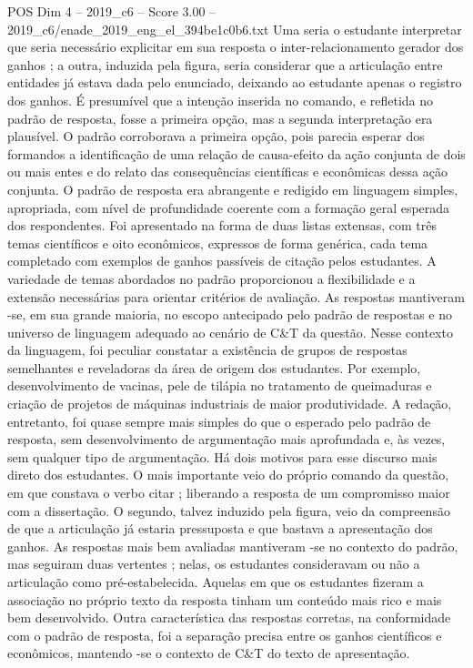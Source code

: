 \begin{textsample}{POS Dim 4 – 2019\_c6 – Score 3.00 – 2019\_c6/enade\_2019\_eng\_el\_394be1c0b6.txt}
Uma seria o estudante interpretar que seria necessário explicitar em sua resposta o inter-relacionamento gerador dos ganhos ; a outra, induzida pela figura, seria considerar que a articulação entre entidades já estava dada pelo enunciado, deixando ao estudante apenas o registro dos ganhos.
É presumível que a intenção inserida no comando, e refletida no padrão de resposta, fosse a primeira opção, mas a segunda interpretação era plausível.
O padrão corroborava a primeira opção, pois parecia esperar dos formandos a identificação de uma relação de causa-efeito da ação conjunta de dois ou mais entes e do relato das consequências científicas e econômicas dessa ação conjunta.
O padrão de resposta era abrangente e redigido em linguagem simples, apropriada, com nível de profundidade coerente com a formação geral esperada dos respondentes.
Foi apresentado na forma de duas listas extensas, com três temas científicos e oito econômicos, expressos de forma genérica, cada tema completado com exemplos de ganhos passíveis de citação pelos estudantes.
A variedade de temas abordados no padrão proporcionou a flexibilidade e a extensão necessárias para orientar critérios de avaliação.
As respostas mantiveram -se, em sua grande maioria, no escopo antecipado pelo padrão de respostas e no universo de linguagem adequado ao cenário de C\&T da questão.
Nesse contexto da linguagem, foi peculiar constatar a existência de grupos de respostas semelhantes e reveladoras da área de origem dos estudantes.
Por exemplo, desenvolvimento de vacinas, pele de tilápia no tratamento de queimaduras e criação de projetos de máquinas industriais de maior produtividade.
A redação, entretanto, foi quase sempre mais simples do que o esperado pelo padrão de resposta, sem desenvolvimento de argumentação mais aprofundada e, às vezes, sem qualquer tipo de argumentação.
Há dois motivos para esse discurso mais direto dos estudantes.
O mais importante veio do próprio comando da questão, em que constava o verbo citar ; liberando a resposta de um compromisso maior com a dissertação.
O segundo, talvez induzido pela figura, veio da compreensão de que a articulação já estaria pressuposta e que bastava a apresentação dos ganhos.
As respostas mais bem avaliadas mantiveram -se no contexto do padrão, mas seguiram duas vertentes ; nelas, os estudantes consideravam ou não a articulação como pré-estabelecida.
Aquelas em que os estudantes fizeram a associação no próprio texto da resposta tinham um conteúdo mais rico e mais bem desenvolvido.
Outra característica das respostas corretas, na conformidade com o padrão de resposta, foi a separação precisa entre os ganhos científicos e econômicos, mantendo -se o contexto de C\&T do texto de apresentação.

\end{textsample}
